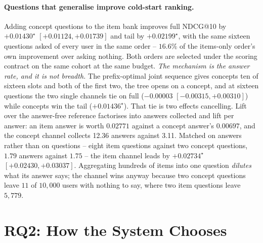 \documentclass[runningheads]{llncs}
\begin{document}
\paragraph{Questions that generalise improve cold-start ranking.}
Adding concept questions to the item bank improves full NDCG@10 by
$+0.01430^\star$ $[+0.01124,+0.01739]$ and tail by $+0.02199^\star$, with the same sixteen questions asked of every user in the same order
-- $16.6\%$ of the items-only order's own improvement over asking nothing. Both orders are selected under
the scoring contract on the same cohort at the same budget. \emph{The mechanism is the answer rate, and it is not breadth.} The prefix-optimal joint
sequence gives concepts ten of sixteen slots and both of the first two, the tree opens on a concept,
and at sixteen questions the two single channels tie on full ($-0.00003$ $[-0.00315,+0.00310]$) while
concepts win the tail ($+0.01436^\star$). That tie is two effects cancelling. Lift over the answer-free reference factorises into answers
collected and lift per answer: an item answer is worth $0.02771$ against a concept answer's
$0.00697$, and the concept channel collects 12.36 answers against 3.11.
Matched on answers rather than on questions -- eight item questions against two concept questions,
$1.79$ answers against $1.75$ -- the item channel leads by $+0.02734^\star$ $[+0.02430,+0.03037]$.
Aggregating hundreds of items into one question \emph{dilutes} what its answer says; the channel wins anyway because two concept questions
leave $11$ of $10{,}000$ users with nothing to say, where two item questions leave $5{,}779$.

\section{RQ2: How the System Chooses}
\label{sec:rq2}
\end{document}
